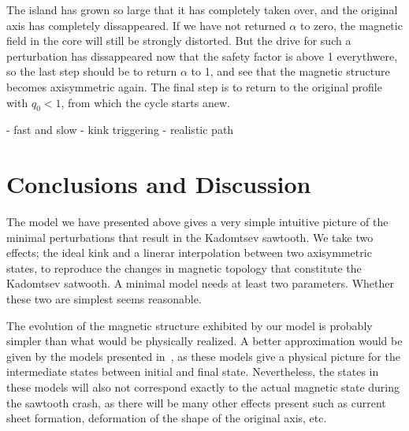 \documentclass[%
superscriptaddress,
amsmath,amssymb,
aps,
pre,
floatfix,
]{revtex4-2}
\begin{document}
The island has grown so large that it has completely taken over, and the original axis has completely dissappeared. 
If we have not returned $\alpha$ to zero, the magnetic field in the core will still be strongly distorted. 
But the drive for such a perturbation has dissappeared now that the safety factor is above 1 everythwere, so the last step should be to return $\alpha$ to 1, and see that the magnetic structure becomes axisymmetric again. 
The final step is to return to the original profile with $q_0<1$, from which the cycle starts anew. 

- fast and slow
- kink triggering
- realistic path

\section*{Conclusions and Discussion}
The model we have presented above gives a very simple intuitive picture of the minimal perturbations that result in the Kadomtsev sawtooth. 
We take two effects; the ideal kink and a linerar interpolation between two axisymmetric states, to reproduce the changes in magnetic topology that constitute the Kadomtsev satwooth. 
A minimal model needs at least two parameters. Whether these two are simplest seems reasonable. 

The evolution of the magnetic structure exhibited by our model is probably simpler than what would be physically realized. 
A better approximation would be given by the models presented in~\cite{kolesnichenko1996theory, jaulmes2014redistribution}, as these models give a physical picture for the intermediate states between initial and final state. 
Nevertheless, the states in these models will also not correspond exactly to the actual magnetic state during the sawtooth crash, as there will be many other effects present such as current sheet formation, deformation of the shape of the original axis, etc.




\end{document}
